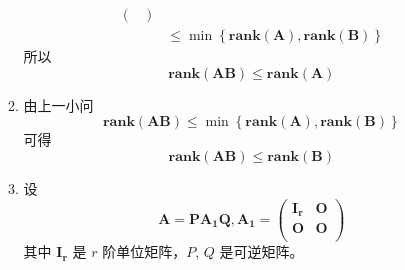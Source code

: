 \documentclass[11pt,letter,notitlepage]{article}
\newcommand{\rank}[1]{ \textbf{rank}  (#1)  }
\begin{document}
\begin{solution}
\begin{enumerate}
\begin{enumerate}
$$\begin{aligned}
{\begin{pmatrix}
						            \end{pmatrix}}                          \\
					             & \le \min \left\{\rank{\mathbf{A}}, \rank{\mathbf{B}}\right\}
				            \end{aligned}$$
			            所以
			            $$\rank{\mathbf{A}\mathbf{B}} \le \rank{\mathbf{A}}$$
			      \item 由上一小问
			            $$\rank{\mathbf{A}\mathbf{B}} \le \min \left\{\rank{\mathbf{A}}, \rank{\mathbf{B}}\right\}$$
			            可得
			            $$\rank{\mathbf{A}\mathbf{B}} \le \rank{\mathbf{B}}$$
			      \item 设
			            $$\mathbf{A}=\mathbf{P}\mathbf{A_1}\mathbf{Q},
				            \mathbf{A_1}=\begin{pmatrix}
					            \mathbf{I_r} & \mathbf{O} \\
					            \mathbf{O}   & \mathbf{O} \\
				            \end{pmatrix}$$
			            其中 $\mathbf{I_r}$ 是 $r$ 阶单位矩阵，$P$, $Q$ 是可逆矩阵。


\end{enumerate}
\end{enumerate}
\end{solution}
\end{document}
